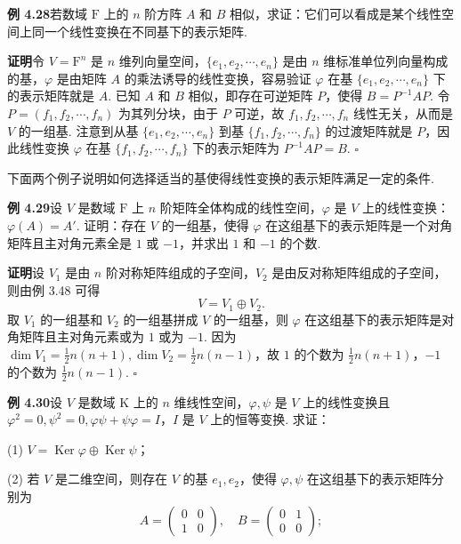 \documentclass[UTF8, 12pt, fontset=fandol, oneside]{ctexart}
\begin{document}
\noindent\textbf{例 4.28}\quad 若数域 $\mathrm{F}$ 上的 $n$ 阶方阵 $A$ 和 $B$ 相似，求证：它们可以看成是某个线性空间上同一个线性变换在不同基下的表示矩阵.

\noindent\textbf{证明}\quad 令 $V=\mathrm{F}^n$ 是 $n$ 维列向量空间，$\{e_1,e_2,\cdots,e_n\}$ 是由 $n$ 维标准单位列向量构成的基，$\varphi$ 是由矩阵 $A$ 的乘法诱导的线性变换，容易验证 $\varphi$ 在基 $\{e_1,e_2,\cdots,e_n\}$ 下的表示矩阵就是 $A$. 已知 $A$ 和 $B$ 相似，即存在可逆矩阵 $P$，使得 $B=P^{-1}AP$. 令 $P=(f_1,f_2,\cdots,f_n)$ 为其列分块，由于 $P$ 可逆，故 $f_1,f_2,\cdots,f_n$ 线性无关，从而是 $V$ 的一组基. 注意到从基 $\{e_1,e_2,\cdots,e_n\}$ 到基 $\{f_1,f_2,\cdots,f_n\}$ 的过渡矩阵就是 $P$，因此线性变换 $\varphi$ 在基 $\{f_1,f_2,\cdots,f_n\}$ 下的表示矩阵为 $P^{-1}AP=B$. $\square$

下面两个例子说明如何选择适当的基使得线性变换的表示矩阵满足一定的条件.

\noindent\textbf{例 4.29}\quad 设 $V$ 是数域 $\mathrm{F}$ 上 $n$ 阶矩阵全体构成的线性空间，$\varphi$ 是 $V$ 上的线性变换：$\varphi(A)=A'$. 证明：存在 $V$ 的一组基，使得 $\varphi$ 在这组基下的表示矩阵是一个对角矩阵且主对角元素全是 $1$ 或 $-1$，并求出 $1$ 和 $-1$ 的个数.

\noindent\textbf{证明}\quad 设 $V_1$ 是由 $n$ 阶对称矩阵组成的子空间，$V_2$ 是由反对称矩阵组成的子空间，则由例 3.48 可得
\[
V=V_1\oplus V_2.
\]
取 $V_1$ 的一组基和 $V_2$ 的一组基拼成 $V$ 的一组基，则 $\varphi$ 在这组基下的表示矩阵是对角矩阵且主对角元素或为 $1$ 或为 $-1$. 因为 $\dim V_1=\frac12n(n+1),\dim V_2=\frac12n(n-1)$，故 $1$ 的个数为 $\frac12n(n+1)$，$-1$ 的个数为 $\frac12n(n-1)$. $\square$

\noindent\textbf{例 4.30}\quad 设 $V$ 是数域 $\mathrm{K}$ 上的 $n$ 维线性空间，$\varphi,\psi$ 是 $V$ 上的线性变换且 $\varphi^2=0,\psi^2=0,\varphi\psi+\psi\varphi=I$，$I$ 是 $V$ 上的恒等变换. 求证：

(1) $V=\operatorname{Ker}\varphi\oplus\operatorname{Ker}\psi$；

(2) 若 $V$ 是二维空间，则存在 $V$ 的基 $e_1,e_2$，使得 $\varphi,\psi$ 在这组基下的表示矩阵分别为
\[
A=\left(\begin{array}{cc}0&0\\1&0\end{array}\right),\quad
B=\left(\begin{array}{cc}0&1\\0&0\end{array}\right);
\]
\end{document}
